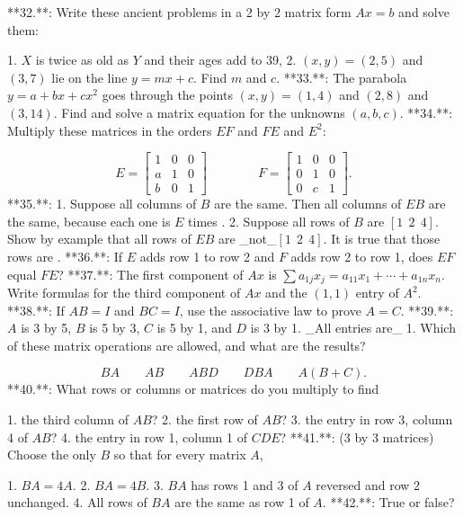 

**32.**: Write these ancient problems in a 2 by 2 matrix form \(Ax=b\) and solve them:

1. \(X\) is twice as old as \(Y\) and their ages add to 39,
2. \((x,y)=(2,5)\) and \((3,7)\) lie on the line \(y=mx+c\). Find \(m\) and \(c\).
**33.**: The parabola \(y=a+bx+cx^{2}\) goes through the points \((x,y)=(1,4)\) and \((2,8)\) and \((3,14)\). Find and solve a matrix equation for the unknowns \((a,b,c)\).
**34.**: Multiply these matrices in the orders \(EF\) and \(FE\) and \(E^{2}\):

\[E=\begin{bmatrix}1&0&0\\ a&1&0\\ b&0&1\end{bmatrix}\qquad\qquad F=\begin{bmatrix}1&0&0\\ 0&1&0\\ 0&c&1\end{bmatrix}.\]
**35.**:
1. Suppose all columns of \(B\) are the same. Then all columns of \(EB\) are the same, because each one is \(E\) times .
2. Suppose all rows of \(B\) are \([1\ \ 2\ \ 4]\). Show by example that all rows of \(EB\) are _not_\([1\ \ 2\ \ 4]\). It is true that those rows are .
**36.**: If \(E\) adds row 1 to row 2 and \(F\) adds row 2 to row 1, does \(EF\) equal \(FE\)?
**37.**: The first component of \(Ax\) is \(\sum a_{1j}x_{j}=a_{11}x_{1}+\cdots+a_{1n}x_{n}\). Write formulas for the third component of \(Ax\) and the \((1,1)\) entry of \(A^{2}\).
**38.**: If \(AB=I\) and \(BC=I\), use the associative law to prove \(A=C\).
**39.**: \(A\) is 3 by 5, \(B\) is 5 by 3, \(C\) is 5 by 1, and \(D\) is 3 by 1. _All entries are_ 1. Which of these matrix operations are allowed, and what are the results?

\[BA\qquad AB\qquad ABD\qquad DBA\qquad A(B+C).\]
**40.**: What rows or columns or matrices do you multiply to find

1. the third column of \(AB\)?
2. the first row of \(AB\)?
3. the entry in row 3, column 4 of \(AB\)?
4. the entry in row 1, column 1 of \(CDE\)?
**41.**: (3 by 3 matrices) Choose the only \(B\) so that for every matrix \(A\),

1. \(BA=4A\).
2. \(BA=4B\).
3. \(BA\) has rows 1 and 3 of \(A\) reversed and row 2 unchanged.
4. All rows of \(BA\) are the same as row 1 of \(A\).
**42.**: True or false?